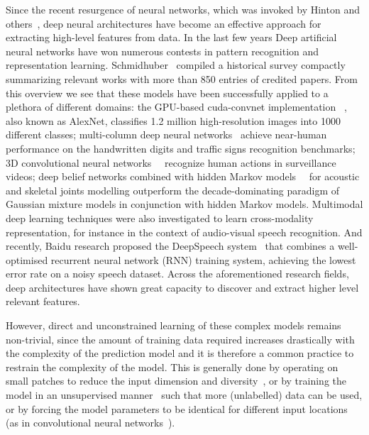 Since the recent resurgence of neural networks, which was invoked by Hinton and others~\cite{hinton2006fast},
deep neural architectures have become an effective approach for extracting high-level features from data.
In the last few years Deep artificial neural networks have won numerous contests in pattern recognition and representation learning.
Schmidhuber~\cite{schmidhuber2014deep} compiled a historical survey compactly summarizing relevant works with more than 850 entries of credited papers.
From this overview we see that these models have been successfully applied to a plethora of different domains: the GPU-based cuda-convnet implementation~\cite{krizhevsky2012imagenet} , also known as AlexNet, classifies 1.2 million high-resolution images into 1000 different classes; multi-column deep neural networks~\cite{ciresan2012multi} achieve near-human performance on the handwritten digits and traffic signs recognition benchmarks; 3D convolutional neural networks~\cite{3dcnn}~\cite{ji20133d} recognize human actions in surveillance videos; deep belief networks combined with hidden Markov models~\cite{mohamed2012acoustic}~\cite{diwucvpr14} for acoustic and skeletal joints modelling outperform the decade-dominating paradigm of Gaussian mixture models in conjunction with hidden Markov models.
%
Multimodal deep learning techniques were also investigated \cite{Ngiam2011multimodal} to learn cross-modality representation,
for instance in the context of audio-visual speech recognition.
%
And recently, Baidu research proposed the DeepSpeech system~\cite{hannun2014deepspeech} that combines a well-optimised recurrent neural network (RNN) training system, achieving the lowest error rate on a noisy speech dataset. Across the aforementioned research fields, deep architectures have shown great capacity to discover and extract higher level relevant features.

However, direct and unconstrained learning of these complex models remains non-trivial, since the amount of  training data required increases drastically with the complexity of the prediction model and %
it is therefore a common practice to restrain the complexity of the model. This is generally done by operating on small patches to reduce the input dimension and diversity~\cite{baccouche2005spatio}, or by training the model in an unsupervised manner~\cite{le2011learning} such that more (unlabelled) data can be used, or by forcing the model parameters to be identical for different input locations (as in convolutional neural networks~\cite{krizhevsky2012imagenet,ciresan2012multi,3dcnn}).


